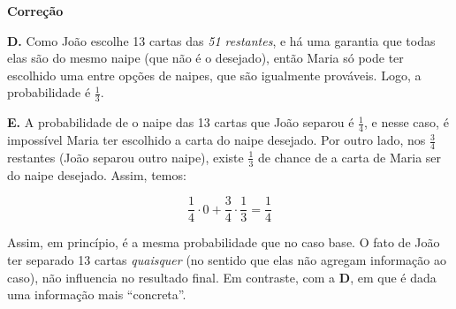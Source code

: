 \documentclass{article}
\begin{document}
\textbf{Correção} 

\textbf{D.} Como João escolhe 13 cartas das \textit{51 restantes}, e há uma garantia que todas elas são do mesmo naipe (que não é o desejado), então Maria só pode ter escolhido uma entre opções de naipes, que são igualmente prováveis. Logo, a probabilidade é \( \frac{1}{3} \).

\textbf{E.} A probabilidade de o naipe das 13 cartas que João separou é \( \frac{1}{4} \), e nesse caso, é impossível Maria ter escolhido a carta do naipe desejado. Por outro lado, nos \( \frac{3}{4} \) restantes (João separou outro naipe), existe \( \frac{1}{3} \) de chance de a carta de Maria ser do naipe desejado. Assim, temos:

\[ \frac{1}{4} \cdot 0 + \frac{3}{4} \cdot \frac{1}{3} = \frac{1}{4} \] 

Assim, em princípio, é a mesma probabilidade que no caso base. O fato de João ter separado 13 cartas \textit{quaisquer} (no sentido que elas não agregam informação ao caso), não influencia no resultado final. Em contraste, com a \textbf{D}, em que é dada uma informação mais ``concreta''.
\end{document}
